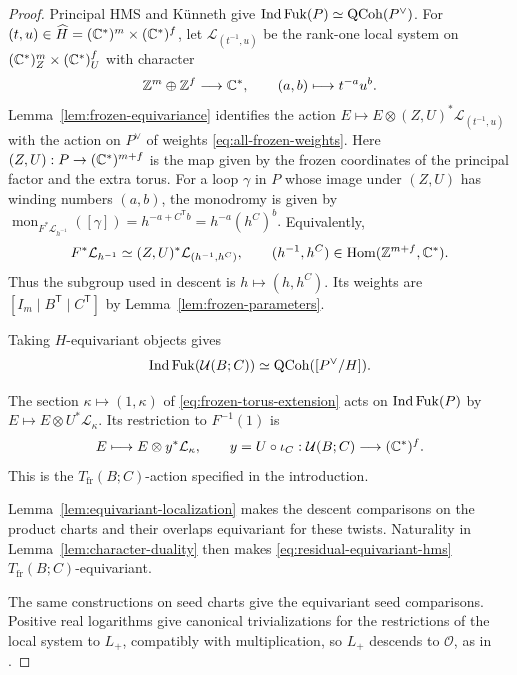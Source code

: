 \documentclass[12pt, letter]{amsart}
\theoremstyle{definition}
\newcommand{\Z}{\mathbb Z}
\newcommand{\OO}{\mathcal O}
\newcommand{\fr}{\mathrm{fr}}
\DeclareMathOperator{\Ind}{Ind}
\numberwithin{equation}{section}
\begin{document}
\begin{proof}
Principal HMS and K\"unneth give
$\Ind\Fuk(P)\simeq\QCoh(P^\vee)$.
For $(t,u)\in\widehat H=(\mathbb C^*)^m\times(\mathbb C^*)^f$, let
$\mathcal L_{(t^{-1},u)}$ be the rank-one local system on
$(\mathbb C^*)^m_Z\times(\mathbb C^*)^f_U$ with character
\[
 \Z^m\oplus\Z^f\longrightarrow\C^*,
 \qquad (a,b)\longmapsto t^{-a}u^b.
\]
Lemma~\ref{lem:frozen-equivariance} identifies the action
$E\mapsto E\otimes(Z,U)^*\mathcal L_{(t^{-1},u)}$ with the
action on $P^\vee$ of weights \eqref{eq:all-frozen-weights}.
Here $(Z,U):P\to(\mathbb C^*)^{m+f}$ is the map given by the frozen
coordinates of the principal factor and the extra torus.
For a loop $\gamma$ in $P$ whose image under $(Z,U)$ has
winding numbers $(a,b)$, the monodromy is given by 
$
 \operatorname{mon}_{F^*\mathcal L_{h^{-1}}}([\gamma])
 =h^{-a+C^{\mathsf T}b}=h^{-a}(h^C)^b.$
Equivalently,
\[
 F^*\mathcal L_{h^{-1}}
 \simeq (Z,U)^*\mathcal L_{(h^{-1},h^C)},
 \qquad
 (h^{-1},h^C)\in\Hom(\Z^{m+f},\C^*).
\]
Thus the subgroup used in descent is $h\mapsto(h,h^C)$.
Its weights are $[I_m\mid B^{\mathsf T}\mid C^{\mathsf T}]$
by Lemma~\ref{lem:frozen-parameters}.

Taking $H$-equivariant objects gives
\begin{equation}\label{eq:residual-equivariant-hms}
 \Ind\Fuk(\cU(B;C))\simeq\QCoh([P^\vee/H]).
\end{equation}


The section $\kappa\mapsto(1,\kappa)$ of
\eqref{eq:frozen-torus-extension} acts on $\Ind\Fuk(P)$ by
$E\mapsto E\otimes U^*\mathcal L_\kappa$.
Its restriction to $F^{-1}(1)$ is
\[
 E\longmapsto E\otimes y^*\mathcal L_\kappa,
 \qquad y=U\circ\iota_C:\mathcal{U}(B;C)\longrightarrow(\mathbb C^*)^f.
\]
This is the $T_{\fr}(B;C)$-action specified in the introduction.

Lemma~\ref{lem:equivariant-localization} makes the descent
comparisons on the product charts and their overlaps equivariant
for these twists. Naturality in Lemma~\ref{lem:character-duality}
then makes \eqref{eq:residual-equivariant-hms}
$T_{\fr}(B;C)$-equivariant.

The same constructions on seed charts give the equivariant
seed comparisons. Positive real logarithms give canonical trivializations for the restrictions of the local system to $L_+$, compatibly with multiplication, so
$L_+$ descends to $\OO$, as in \cite[Section~5.5]{HS}.


\end{proof}
\end{document}
